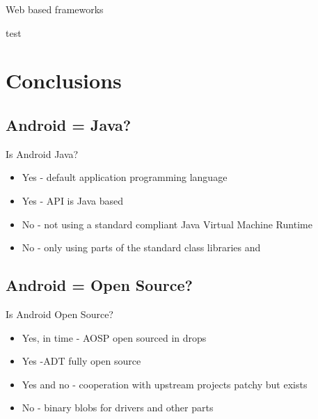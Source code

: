 \documentclass[aspectratio=169]{beamer}
\begin{document}
    \begin{frame}{Web based frameworks}
      \begin{description}
       \item<1->[PhoneGap] test
      \end{description}
    \end{frame}

\section{Conclusions}

  \subsection{Android = Java?}
    \begin{frame}{Is Android Java?}
      \begin{itemize}
      \item<1-> Yes - default application programming language
      \item<2-> Yes - API is Java based
      \item<3-> No - not using a standard compliant Java Virtual Machine Runtime
      \item<4-> No - only using parts of the standard class libraries and 
      \end{itemize}
    \end{frame}

  \subsection{Android = Open Source?}
    \begin{frame}{Is Android Open Source?}
      \begin{itemize}
       \item<1-> Yes, in time - AOSP open sourced in drops
       \item<2-> Yes -ADT fully open source
       \item<3-> Yes and no - cooperation with upstream projects patchy but exists
       \item<4-> No - binary blobs for drivers and other parts
      \end{itemize}
    \end{frame}
\end{document}
